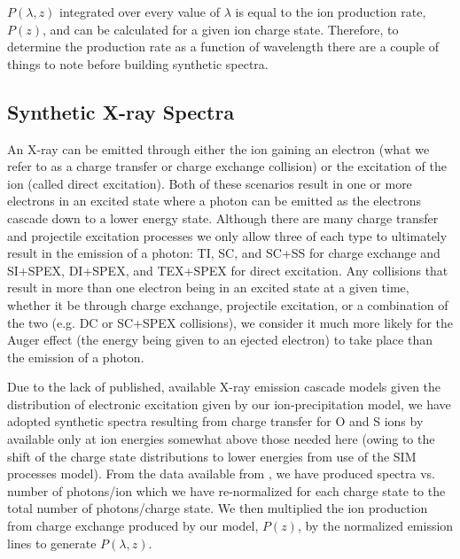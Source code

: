 \documentclass[draft]{agujournal2018}
\begin{document}
$P(\lambda,z)$ integrated over every value of $\lambda$ is equal to the ion production rate, $P(z)$, and can be calculated for a given ion charge state.
Therefore, to determine the production rate as a function of wavelength there are a couple of things to note before building synthetic spectra.

\subsection{Synthetic X-ray Spectra}
\label{sec:SynthXraySpec}

An X-ray can be emitted through either the ion gaining an electron (what we refer to as a charge transfer or charge exchange collision) or the excitation of the ion (called direct excitation).
Both of these scenarios result in one or more electrons in an excited state where a photon can be emitted as the electrons cascade down to a lower energy state.
Although there are many charge transfer and projectile excitation processes we only allow three of each type to ultimately result in the emission of a photon: TI, SC, and SC+SS for charge exchange and SI+SPEX, DI+SPEX, and TEX+SPEX for direct excitation.
Any collisions that result in more than one electron being in an excited state at a given time, whether it be through charge exchange, projectile excitation, or a combination of the two (e.g. DC or SC+SPEX collisions), we consider it much more likely for the Auger effect (the energy being given to an ejected electron) to take place than the emission of a photon.

Due to the lack of published, available X-ray emission cascade models given the distribution of electronic excitation given by our ion-precipitation model, we have adopted synthetic spectra resulting from charge transfer for O and S ions by \citet{hui2010} available only at ion energies somewhat above those needed here (owing to the shift of the charge state distributions to lower energies from use of the SIM processes model).
From the data available from \citet{hui2010}, we have produced spectra vs. number of photons/ion which we have re-normalized for each charge state to the total number of photons/charge state.
We then multiplied the ion production from charge exchange produced by our model, $P(z)$, by the normalized emission lines to generate $P(\lambda,z)$.
\end{document}

